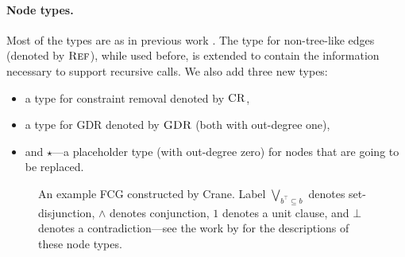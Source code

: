 \paragraph{Node types.}
Most of the types are as in previous work
\citep{DBLP:conf/nips/Broeck11,DBLP:conf/ijcai/BroeckTMDR11}. The type for
non-tree-like edges (denoted by $\operatorname{\textsc{Ref}}$), while used before, is extended to
contain the information necessary to support recursive calls. We also add three
new types:
\begin{itemize}
  \item a type for constraint removal denoted by $\operatorname{\textsc{CR}}$,
  \item a type for GDR denoted by $\operatorname{\textsc{GDR}}$ (both with out-degree one),
  \item and $\star$---a placeholder type (with out-degree zero) for nodes that are going to be replaced.
\end{itemize}

\begin{figure}[t]
  \centering
  \caption{An example FCG constructed by Crane. Label
    $\bigvee_{b^\top \subseteq b}$ denotes set-disjunction, $\land$ denotes
    conjunction, $1$ denotes a unit clause, and $\bot$ denotes a
    contradiction---see the work by \citet{DBLP:conf/ijcai/BroeckTMDR11} for the
    descriptions of these node types.}\label{fig:examplefcg}
\end{figure}

